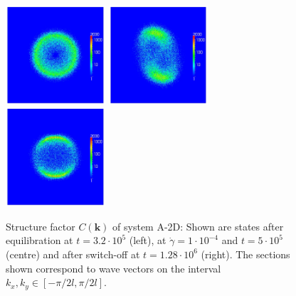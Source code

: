 \documentclass[8.5pt,twoside,twocolumn]{article}
\newcommand{\e}[1]{\cdot10^{#1}}
\begin{document}
\begin{figure}[htp!]
\centering
\includegraphics[angle=0,width=0.33\textwidth]{ck_run703_320.jpg}
\includegraphics[angle=0,width=0.33\textwidth]{ck_run704_500.jpg}
\includegraphics[angle=0,width=0.33\textwidth]{ck_run705_1280.jpg}
\caption{Structure factor $C({\bm k})$ of system A-2D: Shown are states after equilibration at $t=3.2\e{5}$ (left), at $\dot{\gamma}=1\cdot10^{-4}$ and $t=5\e{5}$ (centre) and after switch-off at $t=1.28\e{6}$ (right). The sections shown correspond to wave vectors on the interval $k_x, k_y \in [-\pi/2 l,\pi/2 l]$.}
\label{fig4}
\end{figure}
\end{document}

